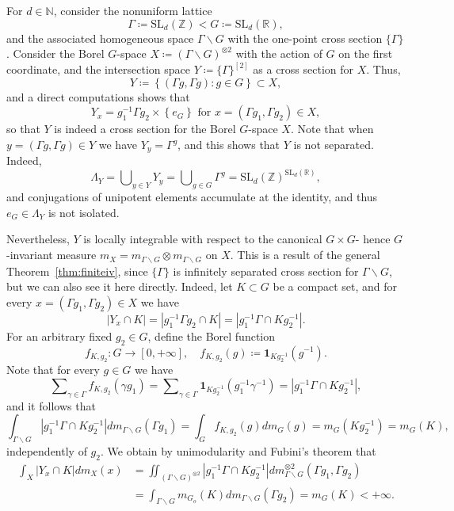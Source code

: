 \documentclass{amsart}
\numberwithin{equation}{subsection}
\theoremstyle{remark}
\begin{document}
For \(d\in\mathbb{N}\), consider the nonuniform lattice
\[\Gamma\coloneqq\mathrm{SL}_{d}\left(\mathbb{Z}\right)<G\coloneqq\mathrm{SL}_{d}\left(\mathbb{R}\right),\]
and the associated homogeneous space \(\Gamma\backslash G\) with the one-point cross section \(\{\Gamma\}\). Consider the Borel \(G\)-space \(X\coloneqq \left(\Gamma\backslash G\right)^{\otimes 2}\) with the action of \(G\) on the first coordinate, and the intersection space \(Y\coloneqq \{\Gamma\}^{\left[2\right]}\) as a cross section for \(X\). Thus,
\[Y\coloneqq\left\{ \left(\Gamma g,\Gamma g\right):g\in G \right\} \subset X,\]
and a direct computations shows that
\[Y_{x}=g_{1}^{-1}\Gamma g_{2}\times\left\{e_{G}\right\} \text{ for }x=\left(\Gamma g_{1},\Gamma g_{2}\right)\in X,\]
so that \(Y\) is indeed a cross section for the Borel \(G\)-space \(X\). Note that when \(y=\left(\Gamma g,\Gamma g\right)\in Y\) we have \(Y_{y}=\Gamma^{g}\), and this shows that \(Y\) is not separated. Indeed,
\[\Lambda_{Y}=\bigcup\nolimits_{y\in Y}Y_{y}=\bigcup\nolimits_{g\in G}\Gamma ^{g}=\mathrm{SL}_{d}\left(\mathbb{Z}\right)^{\mathrm{SL}_{d}\left(\mathbb{R}\right)},\]
and conjugations of unipotent elements accumulate at the identity, and thus \(e_{G}\in\Lambda_{Y}\) is not isolated.

Nevertheless, \(Y\) is locally integrable with respect to the canonical \(G\times G\)- hence \(G\)-invariant measure \(m_{X}=m_{\Gamma\backslash G}\otimes m_{\Gamma\backslash G}\) on \(X\). This is a result of the general Theorem~\ref{thm:finiteiv}, since \(\{\Gamma\}\) is infinitely separated cross section for \(\Gamma\backslash G\), but we can also see it here directly. Indeed, let \(K\subset G\) be a compact set, and for every \(x=\left(\Gamma g_{1},\Gamma g_{2}\right)\in X\) we have
\[\left|Y_{x}\cap K\right|=\left|g_{1}^{-1}\Gamma g_{2}\cap K\right|=\left|g_{1}^{-1}\Gamma \cap Kg_{2}^{-1}\right|.\]
For an arbitrary fixed \(g_{2}\in G\), define the Borel function
\[f_{K,g_{2}}:G \longrightarrow\left[0,+\infty\right],\quad f_{K,g_{2}}\left(g\right)\coloneqq \mathbf{1}_{Kg_{2}^{-1}}\left(g^{-1}\right).\]
Note that for every \(g\in G\) we have
\[\sum\nolimits_{\gamma\in\Gamma }f_{K,g_{2}}\left(\gamma g_{1}\right)=\sum\nolimits_{\gamma\in\Gamma }\mathbf{1}_{Kg_{2}^{-1}}\left(g_{1}^{-1}\gamma^{-1}\right)=\left|g_{1}^{-1}\Gamma\cap Kg_{2}^{-1}\right|,\]
and it follows that
\[\int_{\Gamma\backslash G}\left|g_{1}^{-1}\Gamma \cap Kg_{2}^{-1}\right|dm_{\Gamma\backslash G}\left(\Gamma g_{1}\right)=\int_{G }f_{K,g_{2}}\left(g\right)dm_{G }\left(g\right)=m_{G }\left(Kg_{2}^{-1}\right)=m_{G}\left(K\right),\]
independently of \(g_{2}\). We obtain by unimodularity and Fubini's theorem that
\begin{align*}
\int_{X}\left|Y_{x}\cap K\right|dm_{X}\left(x\right)
&=\iint\nolimits_{\left(\Gamma\backslash G\right)^{\otimes 2}}\left|g_{1}^{-1}\Gamma\cap Kg_{2}^{-1}\right|dm_{\Gamma\backslash G}^{\otimes 2}\left(\Gamma g_{1},\Gamma g_{2}\right)\\
& =\int_{\Gamma\backslash G}m_{G_{o}}\left(K\right)dm_{\Gamma\backslash G}\left(\Gamma g_{2}\right)=m_{G}\left(K\right)<+\infty.
\end{align*}
\end{document}
